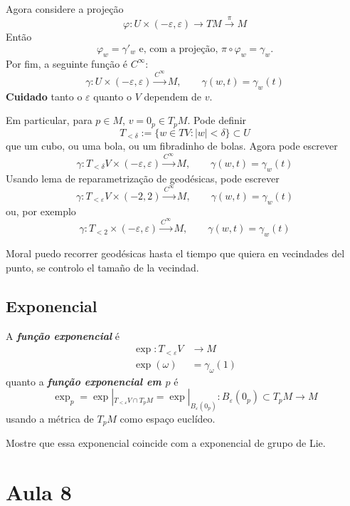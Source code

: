 Agora considere a projeção
\[\varphi: U \times (-\varepsilon,\varepsilon) \longrightarrow TM\xrightarrow{\pi} M\]
Então
\[\varphi_w=\gamma'_w \text{ e, com a projeção, } \pi\circ \varphi_w=\gamma_w.\]
Por fim, a seguinte função é \(C^\infty\):
\[\gamma:U \times (-\varepsilon,\varepsilon) \xrightarrow{C^\infty}M,\qquad  \gamma(w,t)=\gamma_w(t)\]
\textbf{Cuidado} tanto o \(\varepsilon\) quanto o \(V\) dependem de \(v\).

Em particular, para \(p \in M\), \(v =0_p \in T_pM\). Pode definir
\[T_{< \delta}:=\{w \in TV: |w|< \delta\} \subset U\]
que um cubo, ou uma bola, ou um fibradinho de bolas. Agora pode escrever
\[\gamma:T_{< \delta}V \times (-\varepsilon,\varepsilon) \xrightarrow{C^\infty}M,\qquad  \gamma(w,t)=\gamma_w(t)\]
Usando lema de reparametrização de geodésicas, pode escrever
\[\gamma:T_{< \varepsilon}V \times (-2,2) \xrightarrow{C^\infty}M,\qquad  \gamma(w,t)=\gamma_w(t)\]
ou, por exemplo
\[\gamma:T_{<2} \times (-\varepsilon,\varepsilon) \xrightarrow{C^\infty}M,\qquad  \gamma(w,t)=\gamma_w(t)\]

\begin{thing8}{Moral}\leavevmode
puedo recorrer geodésicas hasta el tiempo que quiera en vecindades del punto, se controlo el tamaño de la vecindad.
\end{thing8}

\subsection{Exponencial}

\begin{defn}\leavevmode
	A \textit{\textbf{função exponencial}} é
\begin{align*}
	\operatorname{exp}: T_{<\varepsilon}V  &\longrightarrow M \\
	\operatorname{exp}(\omega) &= \gamma_\omega(1)
\end{align*}
quanto a \textit{\textbf{função exponencial em \(p\)}} é
\[\operatorname{exp}_p=\operatorname{exp}|_{T_{<\varepsilon }V \cap T_p M}=\operatorname{exp}|_{B_\varepsilon(0_p)}:B_\varepsilon(0_p) \subset T_pM \longrightarrow M\]
usando a métrica de \(T_pM\) como espaço euclídeo.
\end{defn}

\begin{exercise}\leavevmode
Mostre que essa exponencial coincide com a exponencial de grupo de Lie.
\end{exercise}

\section{Aula 8}

